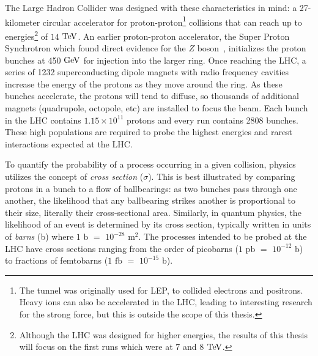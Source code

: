 The Large Hadron Collider was designed with these characteristics in mind: a 27-kilometer circular accelerator for proton-proton\footnote{The tunnel was originally used for LEP, to collided electrons and positrons. Heavy ions can also be accelerated in the LHC, leading to interesting research for the strong force, but this is outside the scope of this thesis.} collisions that can reach up to energies\footnote{Although the LHC was designed for higher energies, the results of this thesis will focus on the first runs which were at $7$ and $8$ $\rm{TeV}$.} of $14$ $\rm{TeV}$. An earlier proton-proton accelerator, the Super Proton Synchrotron which found direct evidence for the $Z$ boson~\cite{Arnison:1983rp,Arnison:1983mk,Bagnaia:1983zx}, initializes the proton bunches at 450 $\rm{GeV}$ for injection into the larger ring. Once reaching the LHC, a series of 1232 superconducting dipole magnets with radio frequency cavities increase the energy of the protons as they move around the ring. As these bunches accelerate, the protons will tend to diffuse, so thousands of additional magnets (quadrupole, octopole, etc) are installed to focus the beam. Each bunch in the LHC contains $1.15\times10^{11}$ protons and every run contains 2808 bunches. These high populations are required to probe the highest energies and rarest interactions expected at the LHC.

To quantify the probability of a process occurring in a given collision, physics utilizes the concept of \textit{cross section} ($\sigma$). This is best illustrated by comparing protons in a bunch to a flow of ballbearings: as two bunches pass through one another, the likelihood that any ballbearing strikes another is proportional to their size, literally their cross-sectional area. Similarly, in quantum physics, the likelihood of an event is determined by its cross section, typically written in units of \textit{barns} (b) where $1$ $\mathrm{b}$ $=$ $10^{-28}$ $\mathrm{m}^2$. The processes intended to be probed at the LHC have cross sections ranging from the order of picobarns ($1$ $\mathrm{pb}$ $=$ $10^{-12}$ $\mathrm{b}$) to fractions of femtobarns ($1$ $\mathrm{fb}$ $=$ $10^{-15}$ $\mathrm{b}$).

